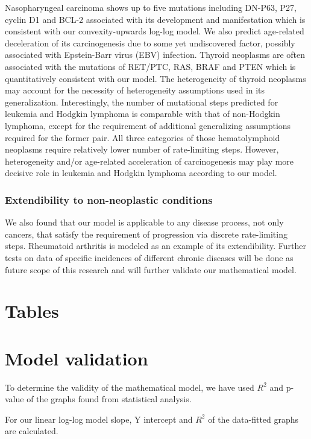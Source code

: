 \documentclass[lineno,sn-basic, Numbered]{sn-jnl}%
\theoremstyle{thmstyleone}%
\theoremstyle{thmstyletwo}%
\theoremstyle{thmstylethree}%
\begin{document}
Nasopharyngeal carcinoma shows up to five mutations including DN-P63, P27, cyclin D1 and BCL-2 associated with its development and manifestation which is consistent with our convexity-upwards log-log model. We also predict age-related deceleration of its carcinogenesis due to some yet undiscovered factor, possibly associated with Epstein-Barr virus (EBV) infection. Thyroid neoplasms are often associated with the mutations of RET/PTC, RAS, BRAF and PTEN which is quantitatively consistent with our model. The heterogeneity of thyroid neoplasms may account for the necessity of heterogeneity assumptions used in its generalization. Interestingly, the number of mutational steps predicted for leukemia and Hodgkin lymphoma is comparable with that of non-Hodgkin lymphoma, except for the requirement of additional generalizing assumptions required for the former pair. All three categories of those hematolymphoid neoplasms require relatively lower number of rate-limiting steps. However, heterogeneity and/or age-related acceleration of carcinogenesis may play more decisive role in leukemia and Hodgkin lymphoma according to our model.

\subsubsection{Extendibility to non-neoplastic conditions}
We also found that our model is applicable to any disease process, not only cancers, that satisfy the requirement of progression via discrete rate-limiting steps. Rheumatoid arthritis is modeled as an example of its extendibility.  Further tests on data of specific incidences of different chronic diseases will be done as future scope of this research and will further validate our mathematical model.


\section{Tables}\label{sec5}

\section*{Model validation}

To determine the validity of the mathematical model, we have used \( R^2 \) and p-value of the graphs found from statistical analysis.

For our linear log-log model slope, Y intercept and \( R^2 \) of the data-fitted graphs are calculated.
 
\end{document}
